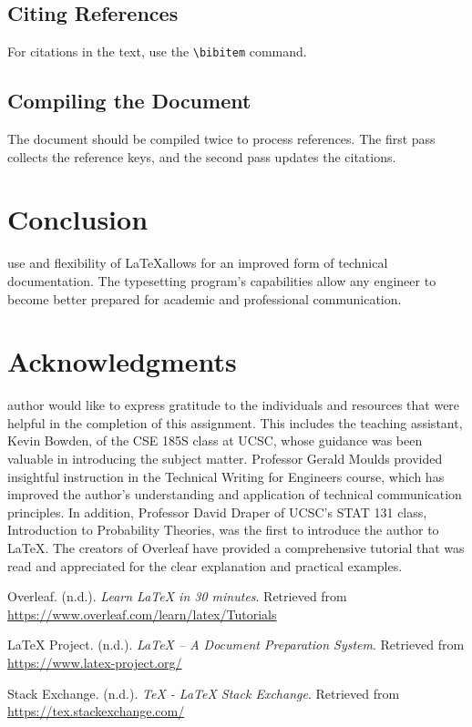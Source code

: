 \documentclass[12pt,journal,compsoc]{IEEEtran}
\begin{document}
\subsection{Citing References}
For citations in the text, use the \texttt{\textbackslash bibitem} command. 

\subsection{Compiling the Document}
The document should be compiled twice to process references. The first pass collects the reference keys, and the second pass updates the citations.

\section{Conclusion}
 use and flexibility of \LaTeX allows for an improved form of technical documentation. The typesetting program's capabilities allow any engineer to become better prepared for academic and professional communication. 

\section*{Acknowledgments}
 author would like to express gratitude to the individuals and resources that were helpful in the completion of this assignment. This includes the teaching assistant, Kevin Bowden, of the CSE 185S class at UCSC, whose guidance was been valuable in introducing the subject matter. Professor Gerald Moulds provided insightful instruction in the Technical Writing for Engineers course, which has improved the author's understanding and application of technical communication principles. In addition, Professor David Draper of UCSC's STAT 131 class, Introduction to Probability Theories, was the first to introduce the author to \LaTeX. The creators of Overleaf have provided a comprehensive tutorial that was read and appreciated for the clear explanation and practical examples.

\begin{thebibliography}{3}
Overleaf. (n.d.). \textit{Learn LaTeX in 30 minutes}. Retrieved from \url{https://www.overleaf.com/learn/latex/Tutorials}

LaTeX Project. (n.d.). \textit{LaTeX – A Document Preparation System}. Retrieved from \url{https://www.latex-project.org/}

Stack Exchange. (n.d.). \textit{TeX - LaTeX Stack Exchange}. Retrieved from \url{https://tex.stackexchange.com/}

\end{thebibliography}
\end{document}
